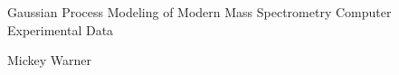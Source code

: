 \begin{center}
\begin{LARGE}
Gaussian Process Modeling of Modern Mass Spectrometry Computer Experimental Data
\end{LARGE}
\end{center}

\begin{center}
\begin{Large}
Mickey Warner
\end{Large}
\end{center}
